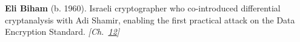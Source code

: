 \textbf{Eli Biham} (b. 1960). Israeli cryptographer who co-introduced differential cryptanalysis with Adi Shamir, enabling the first practical attack on the Data Encryption Standard. \emph{[Ch.~\hyperref[ch:gsmencryptionorder]{12}]}

